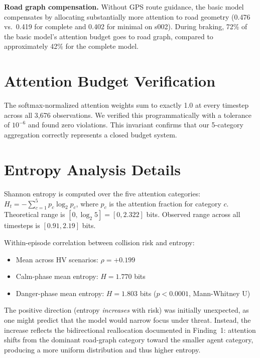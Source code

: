 \documentclass[10pt]{article} %
\begin{document}
\textbf{Road graph compensation.} Without GPS route guidance, the basic model compensates by allocating substantially more attention to road geometry (0.476 vs.\ 0.419 for complete and 0.402 for minimal on s002). During braking, 72\% of the basic model's attention budget goes to road graph, compared to approximately 42\% for the complete model.







\beginSupplementaryMaterials

\section{Attention Budget Verification}
The softmax-normalized attention weights sum to exactly 1.0 at every timestep across all 3,676 observations. We verified this programmatically with a tolerance of $10^{-6}$ and found zero violations. This invariant confirms that our 5-category aggregation correctly represents a closed budget system.

\section{Entropy Analysis Details}
Shannon entropy is computed over the five attention categories: $H_t = -\sum_{c=1}^{5} p_c \log_2 p_c$, where $p_c$ is the attention fraction for category $c$. Theoretical range is $[0, \log_2 5] = [0, 2.322]$ bits. Observed range across all timesteps is $[0.91, 2.19]$ bits.

Within-episode correlation between collision risk and entropy:
\begin{itemize}[leftmargin=*]
    \item Mean across HV scenarios: $\rho = +0.199$
    \item Calm-phase mean entropy: $H = 1.770$ bits
    \item Danger-phase mean entropy: $H = 1.803$ bits ($p < 0.0001$, Mann-Whitney U)
\end{itemize}

The positive direction (entropy \textit{increases} with risk) was initially unexpected, as one might predict that the model would narrow focus under threat. Instead, the increase reflects the bidirectional reallocation documented in Finding~1: attention shifts from the dominant road-graph category toward the smaller agent category, producing a more uniform distribution and thus higher entropy.
\end{document}
